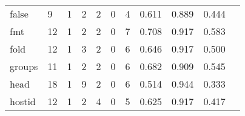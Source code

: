\begin{longtable}{lp{1.2cm}p{1.2cm}p{1.2cm}p{1.2cm}p{1.2cm}p{1.2cm}p{1.2cm}p{1.2cm}p{1.2cm}p{1.2cm}}
false     &                                     9 &                                                  1 &                                                  2 &                                                  2 &                                                  0 &                                                  4 &                                              0.611 &                                              0.889 &                                              0.444 \\
fmt       &                                    12 &                                                  1 &                                                  2 &                                                  2 &                                                  0 &                                                  7 &                                              0.708 &                                              0.917 &                                              0.583 \\
fold      &                                    12 &                                                  1 &                                                  3 &                                                  2 &                                                  0 &                                                  6 &                                              0.646 &                                              0.917 &                                              0.500 \\
groups    &                                    11 &                                                  1 &                                                  2 &                                                  2 &                                                  0 &                                                  6 &                                              0.682 &                                              0.909 &                                              0.545 \\
head      &                                    18 &                                                  1 &                                                  9 &                                                  2 &                                                  0 &                                                  6 &                                              0.514 &                                              0.944 &                                              0.333 \\
hostid    &                                    12 &                                                  1 &                                                  2 &                                                  4 &                                                  0 &                                                  5 &                                              0.625 &                                              0.917 &                                              0.417 \\

\end{longtable}
